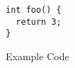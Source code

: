 \begin{figure}
\begin{lstlisting}
int foo() {
  return 3;
}
\end{lstlisting}
\caption{Example Code}
\label{fig:code:ex}
\end{figure}
